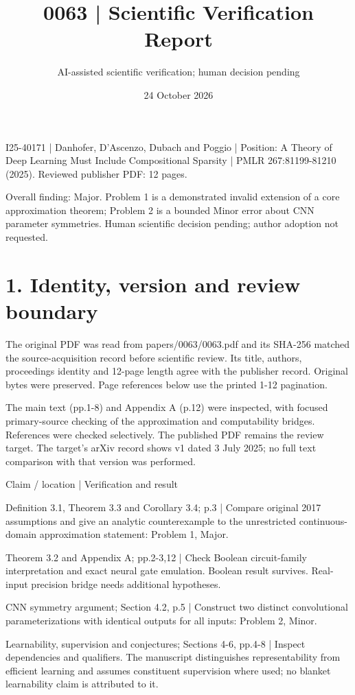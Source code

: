 \documentclass[10pt]{article}
\title{0063 | Scientific Verification Report}
\author{AI-assisted scientific verification; human decision pending}
\date{24 October 2026}
\begin{document}
\maketitle
I25-40171 | Danhofer, D’Ascenzo, Dubach and Poggio | Position: A Theory of Deep Learning Must Include Compositional Sparsity | PMLR 267:81199-81210 (2025). Reviewed publisher PDF: 12 pages.\par
Overall finding: Major. Problem 1 is a demonstrated invalid extension of a core approximation theorem; Problem 2 is a bounded Minor error about CNN parameter symmetries. Human scientific decision pending; author adoption not requested.\par
\section*{1. Identity, version and review boundary}
The original PDF was read from papers/0063/0063.pdf and its SHA-256 matched the source-acquisition record before scientific review. Its title, authors, proceedings identity and 12-page length agree with the publisher record. Original bytes were preserved. Page references below use the printed 1-12 pagination.\par
The main text (pp.1-8) and Appendix A (p.12) were inspected, with focused primary-source checking of the approximation and computability bridges. References were checked selectively. The published PDF remains the review target. The target’s arXiv record shows v1 dated 3 July 2025; no full text comparison with that version was performed.\par
Claim / location | Verification and result\par
Definition 3.1, Theorem 3.3 and Corollary 3.4; p.3 | Compare original 2017 assumptions and give an analytic counterexample to the unrestricted continuous-domain approximation statement: Problem 1, Major.\par
Theorem 3.2 and Appendix A; pp.2-3,12 | Check Boolean circuit-family interpretation and exact neural gate emulation. Boolean result survives. Real-input precision bridge needs additional hypotheses.\par
CNN symmetry argument; Section 4.2, p.5 | Construct two distinct convolutional parameterizations with identical outputs for all inputs: Problem 2, Minor.\par
Learnability, supervision and conjectures; Sections 4-6, pp.4-8 | Inspect dependencies and qualifiers. The manuscript distinguishes representability from efficient learning and assumes constituent supervision where used; no blanket learnability claim is attributed to it.\par
\end{document}
